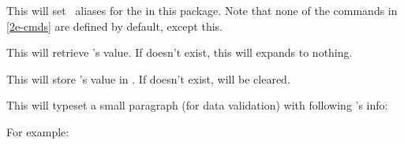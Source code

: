 \documentclass[10pt]{article}
\begin{document}
\begin{codedescribe}{\PkgInfoSetAliases}
\begin{codesyntax}%
\tsmacro{\PkgInfoSetAliases}{}
\end{codesyntax}
This will set \LaTeXe\  aliases for the  in this package. Note that none of the commands in \ref{2e-cmds} are defined by default, except  this.
\end{codedescribe}

\begin{codedescribe}{\PkgInfo}
\begin{codesyntax}%
\end{codesyntax}
This will retrieve 's value. If  doesn't exist, this will expands to nothing.
\end{codedescribe}

\begin{codedescribe}{\PkgInfoGet}
\begin{codesyntax}%
\end{codesyntax}
This will store 's value in . If  doesn't exist,  will be cleared.
\end{codedescribe}


\begin{codedescribe}{\PkgInfoDescription}
\begin{codesyntax}%
\end{codesyntax}
This will typeset a small paragraph (for data validation) with following 's info: 
\end{codedescribe}
For example:
\begin{codestore}[demoC]
\end{codestore}




\end{document}

